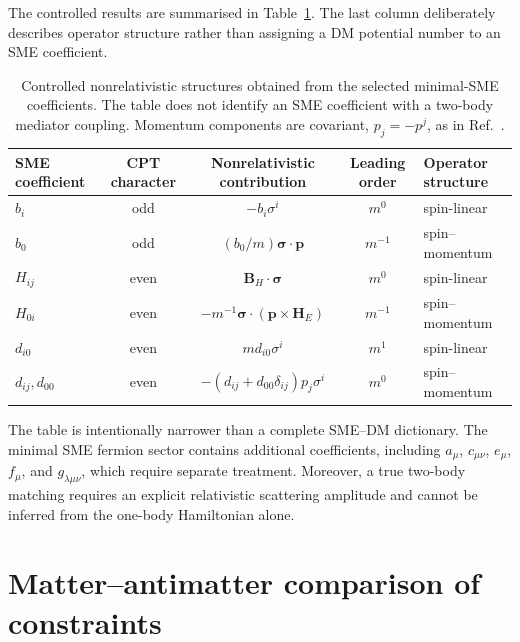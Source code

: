 \documentclass[aps,prd,reprint,superscriptaddress,nofootinbib]{revtex4-2}
\begin{document}
	The controlled results are summarised in Table~\ref{tab:matching}.
	The last column deliberately describes operator structure rather than
	assigning a DM potential number to an SME coefficient.
	
	\begin{table}[t]
		\caption{Controlled nonrelativistic structures obtained from the selected minimal-SME coefficients. The table does not identify an SME coefficient with a two-body mediator coupling. Momentum components are covariant, $p_j=-p^j$, as in Ref.~\cite{KosteleckyLane1999}.}
		\label{tab:matching}
		\begin{ruledtabular}
			\begin{tabular}{lcccl}
				SME coefficient & CPT character & Nonrelativistic contribution
				& Leading order & Operator structure\\
				\hline
				$b_i$
				& odd
				& $-b_i\sigma^i$
				& $m^0$
				& spin-linear
				\\
				$b_0$
				& odd
				& $(b_0/m)\boldsymbol{\sigma}\cdot\mathbf p$
				& $m^{-1}$
				& spin--momentum
				\\
				$H_{ij}$
				& even
				& $\mathbf B_H\cdot\boldsymbol{\sigma}$
				& $m^0$
				& spin-linear
				\\
				$H_{0i}$
				& even
				& $-m^{-1}\boldsymbol{\sigma}\cdot
				(\mathbf p\times\mathbf H_E)$
				& $m^{-1}$
				& spin--momentum
				\\
				$d_{i0}$
				& even
				& $m d_{i0}\sigma^i$
				& $m^1$
				& spin-linear
				\\
				$d_{ij},d_{00}$
				& even
				& $-(d_{ij}+d_{00}\delta_{ij})p_j\sigma^i$
				& $m^0$
				& spin--momentum
			\end{tabular}
		\end{ruledtabular}
	\end{table}
	
	The table is intentionally narrower than a complete SME--DM
	dictionary. The minimal SME fermion sector contains additional
	coefficients, including $a_\mu$, $c_{\mu\nu}$, $e_\mu$, $f_\mu$, and
	$g_{\lambda\mu\nu}$, which require separate treatment. Moreover, a
	true two-body matching requires an explicit relativistic scattering
	amplitude and cannot be inferred from the one-body Hamiltonian alone.
	
	\section{Matter--antimatter comparison of constraints}
	
\end{document}
